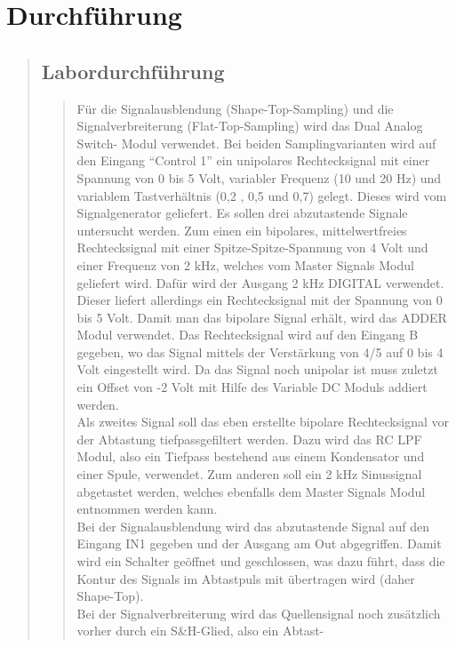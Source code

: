 \section{Durchführung}
\begin{quote}
    
    
    \subsection{Labordurchführung}
    \begin{quote}
     Für die Signalausblendung (Shape-Top-Sampling) und die Signalverbreiterung (Flat-Top-Sampling) wird das Dual
     Analog Switch- Modul verwendet.
     Bei beiden Samplingvarianten wird auf den Eingang "`Control 1"' ein unipolares Rechtecksignal mit einer Spannung von 0
     bis 5 Volt, variabler Frequenz (10 und 20 Hz) und variablem Tastverhältnis (0,2 , 0,5 und 0,7) gelegt. Dieses wird
     vom Signalgenerator geliefert.
     Es sollen drei abzutastende Signale untersucht werden. Zum einen ein bipolares, mittelwertfreies Rechtecksignal mit
     einer Spitze-Spitze-Spannung von 4 Volt und einer Frequenz von 2 kHz, welches vom Master Signals Modul geliefert
     wird. Dafür wird der Ausgang 2 kHz DIGITAL verwendet. Dieser liefert allerdings ein Rechtecksignal mit der Spannung
     von 0 bis 5 Volt. Damit man das bipolare Signal erhält, wird das ADDER Modul verwendet. Das Rechtecksignal wird auf
     den Eingang B gegeben, wo das Signal mittels der Verstärkung von 4/5 auf 0 bis 4 Volt eingestellt wird. Da das
     Signal noch unipolar ist muss zuletzt ein Offset von -2 Volt mit Hilfe des Variable DC Moduls addiert
     werden.\\
     \noindent\hspace*{4mm}
     Als zweites Signal soll das eben erstellte bipolare Rechtecksignal vor der Abtastung tiefpassgefiltert werden. Dazu
     wird das RC LPF Modul, also ein Tiefpass bestehend aus einem Kondensator und einer Spule, verwendet.
     Zum anderen soll ein 2 kHz Sinussignal abgetastet werden, welches ebenfalls dem Master Signals Modul entnommen
     werden kann.\\
     \noindent\hspace*{4mm}
     Bei der Signalausblendung wird das abzutastende Signal auf den Eingang IN1 gegeben und der Ausgang am Out
     abgegriffen. Damit wird ein Schalter geöffnet und geschlossen, was dazu führt, dass die Kontur des Signals im
     Abtastpuls mit übertragen wird (daher Shape-Top).\\
     Bei der Signalverbreiterung wird das Quellensignal noch zusätzlich vorher durch ein S\&H-Glied, also ein Abtast-

\end{quote}
\end{quote}
